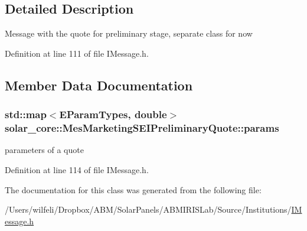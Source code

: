 \subsection{Detailed Description}
Message with the quote for preliminary stage, separate class for now 

Definition at line 111 of file I\+Message.\+h.



\subsection{Member Data Documentation}
\hypertarget{classsolar__core_1_1_mes_marketing_s_e_i_preliminary_quote_abe529e6fd227f28d2aab0c6df56e998d}{}
\subsubsection[{params}]{\setlength{\rightskip}{0pt plus 5cm}std\+::map$<${\bf E\+Param\+Types}, double$>$ solar\+\_\+core\+::\+Mes\+Marketing\+S\+E\+I\+Preliminary\+Quote\+::params}\label{classsolar__core_1_1_mes_marketing_s_e_i_preliminary_quote_abe529e6fd227f28d2aab0c6df56e998d}
parameters of a quote 

Definition at line 114 of file I\+Message.\+h.



The documentation for this class was generated from the following file\+:\begin{DoxyCompactItemize}
\item 
/\+Users/wilfeli/\+Dropbox/\+A\+B\+M/\+Solar\+Panels/\+A\+B\+M\+I\+R\+I\+S\+Lab/\+Source/\+Institutions/\hyperlink{_i_message_8h}{I\+Message.\+h}\end{DoxyCompactItemize}

